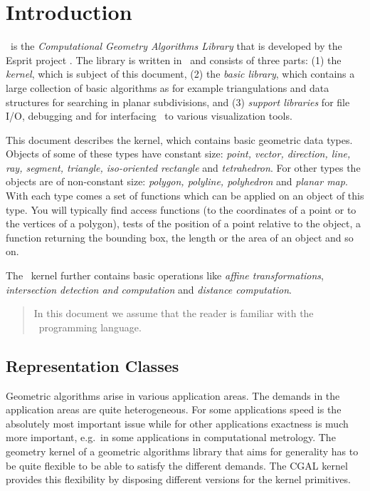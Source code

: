 \cleardoublepage
\chapter{Introduction}

\cgal\ is the {\em Computational Geometry Algorithms Library} that is
developed by the {\sc Esprit} project \cgal.
The library is written in \CC\ and consists of three parts: (1) the
{\em kernel}, which is subject of this document, (2) the {\em basic
library}, which contains a large collection of basic algorithms as for
example triangulations and data structures for searching in planar
subdivisions, and (3) {\em support libraries} for file I/O, debugging and for interfacing \cgal\ to various
visualization tools.

\medskip 
This document describes the kernel, which contains basic geometric
data types. Objects of some of these types have constant size: {\em
point, vector, direction, line, ray, segment, triangle, iso-oriented
rectangle} and {\em tetrahedron}. For other types the objects are of
non-constant size: {\em polygon, polyline, polyhedron} and {\em planar
map}. With each type comes a set of functions which can be applied on
an object of this type.  You will typically find access functions (to
the coordinates of a point or to the vertices of a polygon), tests of
the position of a point relative to the object, a function returning
the bounding box, the length or the area of an object and so on.

The \cgal\ kernel further contains basic operations like {\em affine
transformations}, {\em intersection detection and computation} and
{\em distance computation}.  


\begin{quote}
In this document we assume that the reader is familiar with the 
\CC\ programming language.
\end{quote}

\section{Representation Classes}
Geometric algorithms arise in various application areas.
The demands in the application areas are quite heterogeneous.
For some applications speed is the absolutely most important issue
while for other applications exactness is much more important,
e.g.\ in some applications in computational metrology. 
The geometry kernel of a geometric algorithms
library that aims for generality has to be quite flexible to be 
able to satisfy the different demands.
The CGAL kernel provides this flexibility by disposing different 
versions for the kernel primitives.


